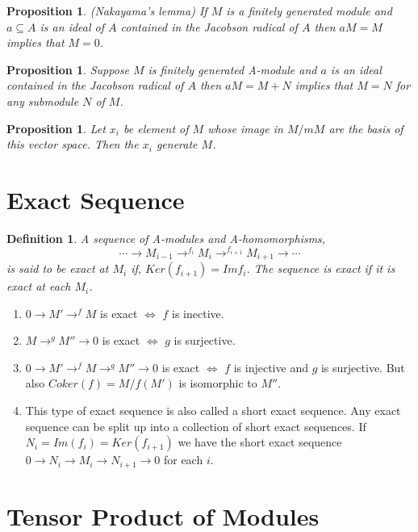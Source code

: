 \documentclass[]{report}
\newtheorem{prop}[theorem]{Proposition}
\newtheorem{defn}[theorem]{Definition}
\begin{document}
\begin{prop} (Nakayama's lemma) If $M$ is a finitely generated module and $a \subseteq A$ is an ideal of $A$ contained in the Jacobson radical of $A$ then $aM = M$ implies that $M = 0$. 
\end{prop}

\begin{prop} Suppose $M$ is finitely generated A-module and $a$ is an ideal contained in the Jacobson radical of $A$ then $aM = M + N$ implies that $M = N$ for any submodule $N$ of $M$. 
\end{prop}

\begin{prop} Let $x_i$ be element of $M$ whose image in $M/mM$ are the basis of this vector space. Then the $x_i$ generate $M$.	
\end{prop}

\section{Exact Sequence}

\begin{defn}
A sequence of A-modules and A-homomorphisms,
$$\cdots \rightarrow M_{i-1} \rightarrow^{f_i} M_i \rightarrow^{f_{i+1}} M_{i+1} \rightarrow \cdots$$ 
is said to be exact at $M_i$ if, $Ker(f_{i+1}) = Im{f_i}$. The sequence is exact if it is exact at each $M_i$. 
\end{defn}

\begin{enumerate}
    \item $0 \rightarrow M' \rightarrow^{f} M$ is exact $\Leftrightarrow$ $f$ is inective.
    \item $M \rightarrow^{g} M'' \rightarrow 0$ is exact $\Leftrightarrow$ $g$ is surjective. 
    \item $0 \rightarrow M' \rightarrow^{f} M \rightarrow^{g} M'' \rightarrow 0$ is exact $\Leftrightarrow$ $f$ is injective and $g$ is surjective. But also $Coker(f) = M/f(M')$ is isomorphic to $M''$. \item This type of exact sequence is also called a short exact sequence. Any exact sequence can be split up into a collection of short exact sequences. If $N_i = Im(f_i) = Ker(f_{i+1})$ we have the short exact sequence $0\rightarrow N_i \rightarrow M_i \rightarrow N_{i+1} \rightarrow 0$ for each $i$. 
\end{enumerate}

\section{Tensor Product of Modules}
\end{document}

